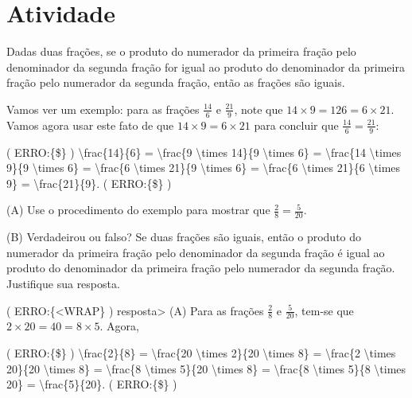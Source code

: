 \documentclass[a4,12pt]{book}
\begin{document}
\section{Atividade}







Dadas duas frações, se o produto do numerador da primeira fração pelo denominador da segunda fração for igual ao produto do denominador da primeira fração pelo numerador da segunda fração, então as frações são iguais. 

Vamos ver um exemplo: para as frações $\frac{14}{6}$ e $\frac{21}{9}$, note que  $14 \times 9 = 126 = 6 \times 21$. Vamos agora usar este fato de que $14 \times 9 = 6 \times 21$
para concluir que $\frac{14}{6} = \frac{21}{9}$:

( ERRO:\{\$\} )
\textbackslash{}frac\{14\}\{6\} = \textbackslash{}frac\{9 \textbackslash{}times 14\}\{9 \textbackslash{}times 6\} = \textbackslash{}frac\{14 \textbackslash{}times 9\}\{9 \textbackslash{}times 6\} = \textbackslash{}frac\{6 \textbackslash{}times 21\}\{9 \textbackslash{}times 6\} = \textbackslash{}frac\{6 \textbackslash{}times 21\}\{6 \textbackslash{}times 9\} = \textbackslash{}frac\{21\}\{9\}.
( ERRO:\{\$\} )

(A) Use o procedimento do exemplo para mostrar que $\frac{2}{8} = \frac{5}{20}$.

(B) Verdadeirou ou falso? Se duas frações são iguais, então o produto do numerador da primeira fração pelo denominador da segunda fração é igual ao produto do denominador da primeira fração pelo numerador da segunda fração. Justifique sua resposta.


( ERRO:\{<WRAP\} ) resposta>
(A) Para as frações $\frac{2}{8}$ e $\frac{5}{20}$, tem-se que  $2 \times 20 = 40 = 8 \times 5$. Agora,

( ERRO:\{\$\} )
\textbackslash{}frac\{2\}\{8\} = \textbackslash{}frac\{20 \textbackslash{}times 2\}\{20 \textbackslash{}times 8\} = \textbackslash{}frac\{2 \textbackslash{}times 20\}\{20 \textbackslash{}times 8\} = \textbackslash{}frac\{8 \textbackslash{}times 5\}\{20 \textbackslash{}times 8\} = \textbackslash{}frac\{8 \textbackslash{}times 5\}\{8 \textbackslash{}times 20\} = \textbackslash{}frac\{5\}\{20\}.
( ERRO:\{\$\} )
\end{document}
